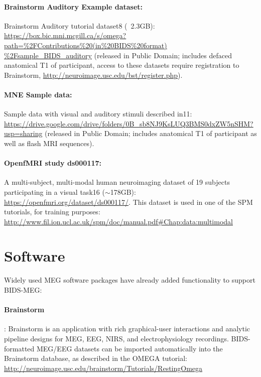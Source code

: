 \paragraph{Brainstorm Auditory Example dataset:} Brainstorm Auditory tutorial dataset8 (~2.3GB):
\url{https://box.bic.mni.mcgill.ca/s/omega?
path=\%2FContributions\%20(in\%20BIDS\%20format)
\%2Fsample_BIDS_auditory} (released in Public Domain; includes defaced anatomical T1 of participant, access to these datasets require registration to Brainstorm, \url{http://neuroimage.usc.edu/bst/register.php}). 

\paragraph{MNE Sample data:} Sample data with visual and auditory stimuli described in11:
\url{https://drive.google.com/drive/folders/0B_sb8NJ9KsLUQ3BMS0dxZW5nSHM?usp=sharing} (released in Public Domain; includes anatomical T1 of participant as well as flash MRI sequences). 

\paragraph{OpenfMRI study ds000117:} A multi-subject, multi-modal human neuroimaging dataset of 19 subjects participating in a visual task16 ($\sim$178GB): \url{https://openfmri.org/dataset/ds000117/}. This dataset is used in one of the SPM tutorials, for training purposes:
\url{http://www.fil.ion.ucl.ac.uk/spm/doc/manual.pdf#Chap:data:multimodal}

\section{Software}
Widely used MEG software packages have already added functionality to support BIDS-MEG:

\paragraph{Brainstorm}\citep{tadel2011brainstorm}: Brainstorm is an application with rich graphical-user interactions and analytic pipeline designs for MEG, EEG, NIRS, and electrophysiology recordings. BIDS-formatted MEG/EEG datasets can be imported automatically into the Brainstorm database, as described in the OMEGA tutorial: \url{http://neuroimage.usc.edu/brainstorm/Tutorials/RestingOmega}

